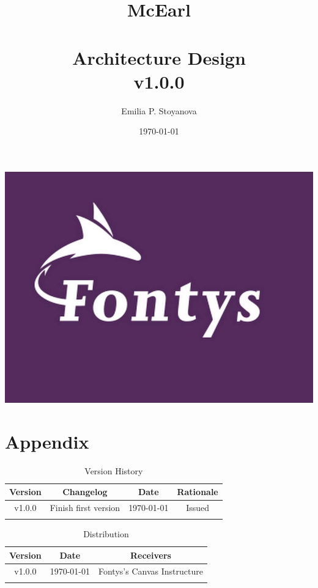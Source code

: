 \documentclass{article}
\title{\textbf{McEarl} \\ \hfill \\ \large Architecture Design \\ \large v1.0.0}
\author{Emilia P. Stoyanova}
\date{\today}
\begin{document}
\maketitle
\begin{center}
    \includegraphics[width=\textwidth,height=\textheight,keepaspectratio]{res/fontys.jpg}
\end{center}

\newpage
\tableofcontents
\listoftables

\fancyhead[l]{}
\fancyfoot[c]{\thepage}

\newpage
\section{Appendix}
\label{section:appendix}
    \begin{table}[h]
        \centering
        \begin{tabular}{ | c | c | c | c | }
            \hline \textbf{Version} & \textbf{Changelog} & \textbf{Date} & \textbf{Rationale} \\
            \hline v1.0.0 & Finish first version & \today & Issued \\
            \hline & & & \\
            \hline
        \end{tabular}
        \caption{Version History}
        \label{tab:version-history}
    \end{table}

    \begin{table}[h]
        \centering
        \begin{tabular}{ | c | c | c | }
            \hline \textbf{Version} & \textbf{Date} & \textbf{Receivers} \\
            \hline v1.0.0 & \today & Fontys's Canvas Instructure \\
            \hline & & \\
            \hline
        \end{tabular}
        \caption{Distribution}
        \label{tab:distribution}
    \end{table}
\end{document}

